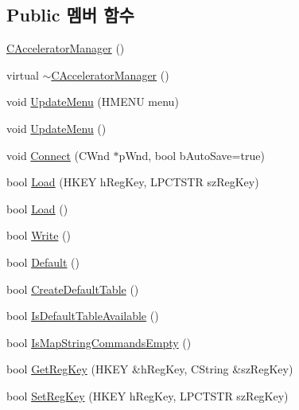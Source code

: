 \subsection*{Public 멤버 함수}
\begin{DoxyCompactItemize}
\item 
\mbox{\hyperlink{class_c_accelerator_manager_a83fbbf342f3ee19cac3366e912edce3e}{C\+Accelerator\+Manager}} ()
\item 
virtual \mbox{\hyperlink{class_c_accelerator_manager_ab46a50eed0acc653852961ac02f4ecb4}{$\sim$\+C\+Accelerator\+Manager}} ()
\item 
void \mbox{\hyperlink{class_c_accelerator_manager_ac7411d20f413ea0ec3bd65705b564adf}{Update\+Menu}} (H\+M\+E\+NU menu)
\item 
void \mbox{\hyperlink{class_c_accelerator_manager_ac854ec5263a7bab961bf63aec3938984}{Update\+Menu}} ()
\item 
void \mbox{\hyperlink{class_c_accelerator_manager_a2d01e04665e3d03f3c1410bd69b0a82c}{Connect}} (C\+Wnd $\ast$p\+Wnd, bool b\+Auto\+Save=true)
\item 
bool \mbox{\hyperlink{class_c_accelerator_manager_a8e87ae6f5464a4fa052c91c0ee361b6d}{Load}} (H\+K\+EY h\+Reg\+Key, L\+P\+C\+T\+S\+TR sz\+Reg\+Key)
\item 
bool \mbox{\hyperlink{class_c_accelerator_manager_a289a9052abea7302d9322283f93cbce6}{Load}} ()
\item 
bool \mbox{\hyperlink{class_c_accelerator_manager_a6ddd05a54ab0e66bc6ca8a7af3742e61}{Write}} ()
\item 
bool \mbox{\hyperlink{class_c_accelerator_manager_aa510a36964ed209de5f7325efa713bf6}{Default}} ()
\item 
bool \mbox{\hyperlink{class_c_accelerator_manager_aaefac809b336df14e1a1a7d60f72ae28}{Create\+Default\+Table}} ()
\item 
bool \mbox{\hyperlink{class_c_accelerator_manager_a508e56037762d035758491d12fd10dfa}{Is\+Default\+Table\+Available}} ()
\item 
bool \mbox{\hyperlink{class_c_accelerator_manager_a6773f028b9c0b04c9a7b6d02c1a96be0}{Is\+Map\+String\+Commands\+Empty}} ()
\item 
bool \mbox{\hyperlink{class_c_accelerator_manager_afcb43e85351bae0fb475dac40ba4cede}{Get\+Reg\+Key}} (H\+K\+EY \&h\+Reg\+Key, C\+String \&sz\+Reg\+Key)
\item 
bool \mbox{\hyperlink{class_c_accelerator_manager_a6ea67e9b2bfbda2f0305024e0d73a5bb}{Set\+Reg\+Key}} (H\+K\+EY h\+Reg\+Key, L\+P\+C\+T\+S\+TR sz\+Reg\+Key)

\end{DoxyCompactItemize}
